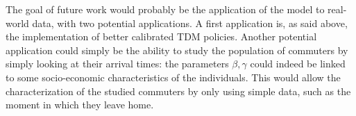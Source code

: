 The goal of future work would probably be the application of the model to real-world data,
with two potential applications.
A first application is, as said above, the implementation of better calibrated TDM policies.
Another potential application could simply be the ability to study the population of commuters by simply looking at their arrival times:
the parameters \(\beta, \gamma\) could indeed be linked to some socio-economic characteristics of the individuals.
This would allow the characterization of the studied commuters by only using simple data,
such as the moment in which they leave home.

